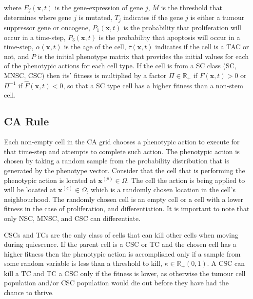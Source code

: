 \documentclass[\main/thesis.tex]{subfiles}
\begin{document}
where $E_j(\boldsymbol{x}, t)$ is the gene-expression of gene $j$, $\overline{M}$ is the threshold that determines where gene $j$ is mutated, $T_j$ indicates if the gene $j$ is either a tumour suppressor gene or oncogene, $P_1(\boldsymbol{x}, t)$ is the probability that proliferation will occur in a time-step, $P_3(\boldsymbol{x}, t)$ is the probability that apoptosis will occur in a time-step, $\alpha(\boldsymbol{x}, t)$ is the age of the cell, $\overline{\tau}(\boldsymbol{x}, t)$ indicates if the cell is a TAC or not, and $\overline{P}$ is the initial phenotype matrix that provides the initial values for each of the phenotypic actions for each cell type.
If the cell is from a SC class (SC, MNSC, CSC) then its' fitness is multiplied by a factor $\Pi {\in} \mathbb{R}_+$ if $\hat{F}(\boldsymbol{x}, t) {>} 0$ or $\Pi^{-1}$ if $\hat{F}(\boldsymbol{x}, t) {<} 0$, so that a SC type cell has a higher fitness than a non-stem cell.

\subsection{CA Rule}
Each non-empty cell in the CA grid chooses a phenotypic action to execute for that 
time-step and attempts to complete such action. The phenotypic action is chosen by 
taking a random sample from the probability distribution that is generated by the 
phenotype vector. Consider that the cell that is performing the phenotypic action
is located at $\boldsymbol{x}^{(p)} {\in} \Omega$. The cell the action is being applied to 
will be located at $\boldsymbol{x}^{(c)} {\in} \Omega$, which is a randomly chosen 
location in the cell's neighbourhood. The randomly chosen cell is an empty cell or a cell with a lower fitness in the case of proliferation, and differentiation. It is important to note that only NSC, MNSC, and CSC can differentiate.

CSCs and TCs are the only class of cells that can kill other cells when moving during quiescence. If the parent cell is a CSC or TC and the chosen cell has a higher fitness then the phenotypic action is accomplished only if a sample from some random variable 
is less than a threshold to kill, $\kappa {\in} \mathbb{R}_+(0, 1)$. A CSC can kill a TC and TC a CSC only if the fitness is lower, as otherwise the tumour cell population and/or CSC population would die out before they have had the chance to thrive. 
\end{document}
